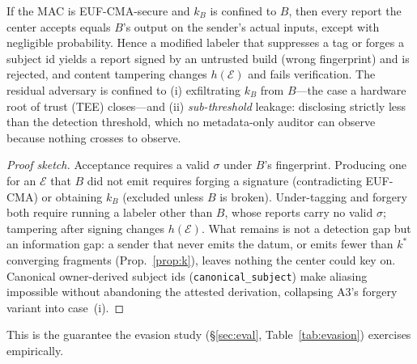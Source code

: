 \documentclass[sigconf,anonymous,review]{acmart}
\theoremstyle{acmplain}
\begin{document}
\begin{proposition}\label{prop:attest}
If the MAC is \textup{EUF-CMA}-secure and $k_B$ is confined to $B$, then
every report the center accepts equals $B$'s output on the sender's actual inputs,
except with negligible probability. Hence a modified labeler that suppresses a tag or
forges a subject id yields a report signed by an untrusted build (wrong fingerprint)
and is rejected, and content tampering changes $h(\mathcal{E})$ and fails
verification. The residual adversary is confined to (i) exfiltrating $k_B$ from
$B$---the case a hardware root of trust (TEE) closes---and (ii) \emph{sub-threshold}
leakage: disclosing strictly less than the detection threshold, which no
metadata-only auditor can observe because nothing crosses to observe.
\end{proposition}
\begin{proof}[Proof sketch]
Acceptance requires a valid $\sigma$ under $B$'s fingerprint. Producing one for an
$\mathcal{E}$ that $B$ did not emit requires forging a signature (contradicting
EUF-CMA) or obtaining $k_B$ (excluded unless $B$ is broken). Under-tagging and forgery
both require running a labeler other than $B$, whose reports carry no valid $\sigma$;
tampering after signing changes $h(\mathcal{E})$. What remains is not a detection gap
but an information gap: a sender that never emits the datum, or emits fewer than
$k^{*}$ converging fragments (Prop.~\ref{prop:k}), leaves nothing the center could key
on. Canonical owner-derived subject ids (\texttt{canonical\_subject}) make aliasing
impossible without abandoning the attested derivation, collapsing A3's forgery variant
into case~(i).
\end{proof}

\noindent This is the guarantee the evasion study (\S\ref{sec:eval},
Table~\ref{tab:evasion}) exercises empirically.
\end{document}
